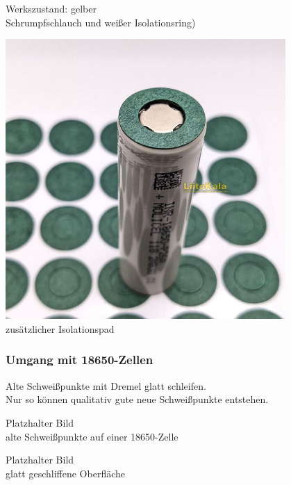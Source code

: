 \documentclass[handout, usenames,dvipsnames, nosymbols,aspectratio=169]{beamer}
\begin{document}
\begin{frame}
\begin{minipage}{0.35\textwidth}
			Werkszustand: gelber\\
			Schrumpfschlauch und weißer Isolationsring)
		\end{minipage}
		\begin{minipage}{0.3\textwidth}
			\centering
			\includegraphics[width=0.8\textwidth]{images/isolated-ring-18650-2.jpg}\\
			zusätzlicher Isolationspad
		\end{minipage}
	\end{frame}
	
	\begin{frame}
		\frametitle{Umgang mit 18650-Zellen}
		Alte Schweißpunkte mit Dremel glatt schleifen.\\ Nur so können qualitativ gute neue Schweißpunkte entstehen.\\[1em]
		\begin{minipage}{0.4\textwidth}
			\centering
			{\color{red}Platzhalter Bild}\\
			alte Schweißpunkte auf einer 18650-Zelle	
		\end{minipage}
		\begin{minipage}{0.4\textwidth}
			\centering
			{\color{red}Platzhalter Bild}\\
			glatt geschliffene Oberfläche
		\end{minipage}
	\end{frame}
	
\end{document}
